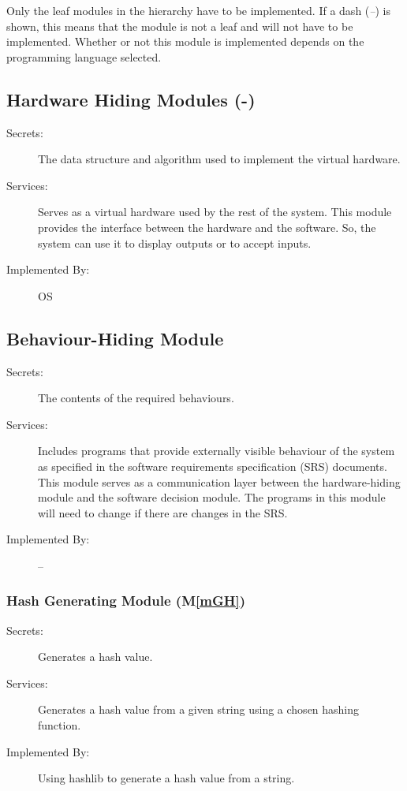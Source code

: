 \documentclass[12pt, titlepage]{article}
\newcommand{\mref}[1]{M\ref{#1}}
\begin{document}
Only the leaf modules in the
hierarchy have to be implemented. If a dash (\emph{--}) is shown, this means
that the module is not a leaf and will not have to be implemented. Whether or
not this module is implemented depends on the programming language
selected.

\subsection{Hardware Hiding Modules (-)}

\begin{description}
\item[Secrets:]The data structure and algorithm used to implement the virtual
  hardware.
\item[Services:]Serves as a virtual hardware used by the rest of the
  system. This module provides the interface between the hardware and the
  software. So, the system can use it to display outputs or to accept inputs.
\item[Implemented By:] OS
\end{description}

\subsection{Behaviour-Hiding Module}

\begin{description}
\item[Secrets:]The contents of the required behaviours.
\item[Services:]Includes programs that provide externally visible behaviour of
  the system as specified in the software requirements specification (SRS)
  documents. This module serves as a communication layer between the
  hardware-hiding module and the software decision module. The programs in this
  module will need to change if there are changes in the SRS.
\item[Implemented By:] --
\end{description}

\subsubsection{Hash Generating Module (\mref{mGH})}

\begin{description}
\item[Secrets:]Generates a hash value.
\item[Services:] Generates a hash value from a given string using a chosen hashing function.
\item[Implemented By:] Using hashlib to generate a hash value from a string.
\end{description}
\end{document}

